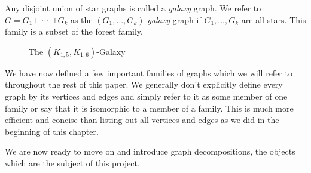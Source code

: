 \begin{definition}
    Any disjoint union of star graphs is called a \textit{galaxy} graph. We refer to $G=G_{1}\sqcup \cdots \sqcup G_{k}$ as the \textit{$(G_{1},\hdots,G_{k})$-galaxy} graph if $G_{1},\hdots,G_{k}$ are all stars. This family is a subset of the forest family.
\end{definition}

\begin{figure}[H]
    \begin{center}
    \end{center}
    \caption{The $(K_{1,5},K_{1,6})$-Galaxy}
    \label{fig:galaxy_close}
    \end{figure}
    
We have now defined a few important families of graphs which we will refer to throughout the rest of this paper. We generally don't explicitly define every graph by its vertices and edges and simply refer to it as some member of one family or say that it is isomorphic to a member of a family. This is much more efficient and concise than listing out all vertices and edges as we did in the beginning of this chapter.

We are now ready to move on and introduce graph decompositions, the objects which are the subject of this project.
  














